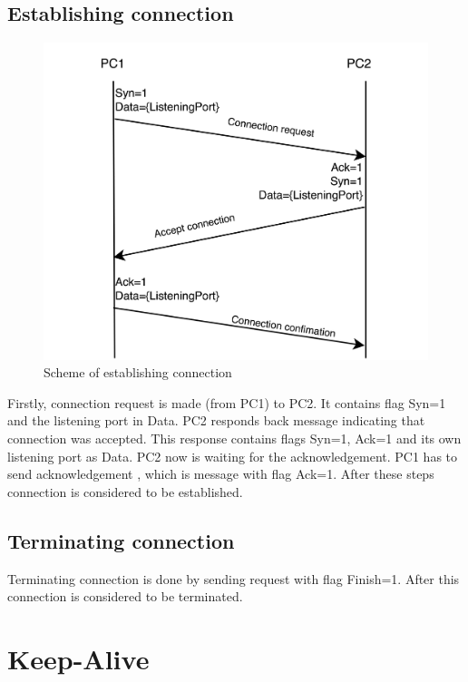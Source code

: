\documentclass{article}
\begin{document}
\subsection{Establishing connection}
\begin{figure}[h]
    \centering
    \includegraphics[width=\textwidth]{images/connection.png}
    \caption{Scheme of establishing connection}
    \label{fig:mesh1}
\end{figure}
Firstly, connection request is made (from PC1) to PC2. It contains flag Syn=1 and the listening port in Data.
\newline
PC2 responds back message indicating that  connection was accepted. This response contains flags Syn=1, Ack=1 and its own listening port as Data. PC2 now is waiting for the acknowledgement.
\newline
PC1 has to send acknowledgement , which is message with flag Ack=1.
\newline
After these steps connection is considered to be established.

\subsection{Terminating connection}

Terminating connection is done by sending request with flag Finish=1. After this connection is considered to be terminated.


\section{Keep-Alive}
\end{document}

